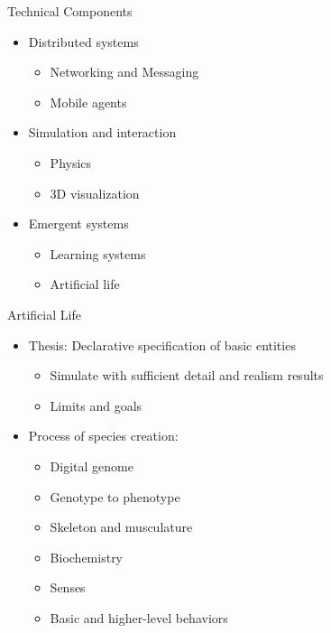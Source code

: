 \documentclass[%
final,
slideColor,
nototal,
nocolorBG,
pdf,
accumulate,
next,
]{prosper}
\begin{document}
\begin{slide}{Technical Components}
  \begin{itemize}
  \item Distributed systems
    \begin{itemize}
    \item Networking and Messaging
    \item Mobile agents
    \end{itemize}
  \item Simulation and interaction
    \begin{itemize}
    \item Physics
    \item 3D visualization
    \end{itemize}
  \item Emergent systems
    \begin{itemize}
    \item Learning systems
    \item Artificial life
    \end{itemize}
  \end{itemize}
\end{slide}

\begin{slide}{Artificial Life}
  \begin{itemize}
  \item Thesis: Declarative specification of basic entities
    \begin{itemize}
    \item Simulate with sufficient detail and realism results
    \item Limits and goals
    \end{itemize}
  \item Process of species creation:
    \begin{itemize}
    \item Digital genome
    \item Genotype to phenotype
    \item Skeleton and musculature
    \item Biochemistry
    \item Senses
    \item Basic and higher-level behaviors
    \end{itemize}
  \end{itemize}
\end{slide}
\end{document}
